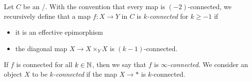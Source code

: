 \begin{definition}
    Let $C$ be an \inftytop/.
    With the convention that every map is $(-2)$-connected, we recursively define that a map $f\colon X\to Y$ in $C$ is \emph{$k$-connected} for $k\geq -1$ if
    \begin{itemize}
        \item it is an effective epimorphism
        \item the diagonal map $X\to X\times_YX$ is $(k-1)$-connected.
    \end{itemize} 
    If $f$ is connected for all $k\in\mathbb{N}$, then we say that $f$ is \emph{$\infty$-connected}.
    We consider an object $X$ to be \emph{$k$-connected} if the map $X\to *$ is $k$-connected.
\end{definition}
